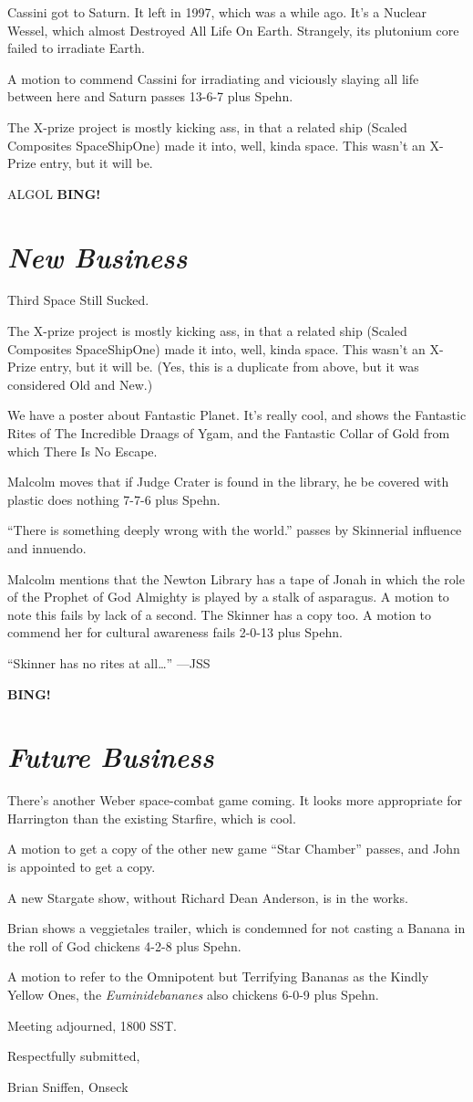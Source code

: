 \documentclass[10pt]{article}
\newcommand{\bing}{{\bf BING!} }
\newcommand{\goto}[1]{\bing \vskip 12pt \section*{{\em{#1}}}}
\newcommand{\ps}{ plus Spehn\xspace}
\begin{document}
Cassini got to Saturn.  It left in 1997, which was a while ago.  It's
a Nuclear Wessel, which almost Destroyed All Life On Earth.
Strangely, its plutonium core failed to irradiate Earth.  

A motion to commend Cassini for irradiating and viciously slaying all
life between here and Saturn passes 13-6-7\ps.

The X-prize project is mostly kicking ass, in that a related ship
(Scaled Composites SpaceShipOne) made it into, well, kinda space.
This wasn't an X-Prize entry, but it will be.

ALGOL
\goto{New Business}

Third Space Still Sucked.

The X-prize project is mostly kicking ass, in that a related ship
(Scaled Composites SpaceShipOne) made it into, well, kinda space.
This wasn't an X-Prize entry, but it will be.  (Yes, this is a
duplicate from above, but it was considered Old and New.)

We have a poster about Fantastic Planet.  It's really cool, and shows
the Fantastic Rites of The Incredible Draags of Ygam, and the
Fantastic Collar of Gold from which There Is No Escape.

Malcolm moves that if Judge Crater is found in the library, he be
covered with plastic does nothing 7-7-6\ps.

``There is something deeply wrong with the world.'' passes by
Skinnerial influence and innuendo.

Malcolm mentions that the Newton Library has a tape of Jonah in which
the role of the Prophet of God Almighty is played by a stalk of
asparagus.  A motion to note this fails by lack of a second.  The
Skinner has a copy too.  A motion to commend her for cultural
awareness fails 2-0-13\ps.

``Skinner has no rites at all\dots'' ---JSS

\goto{Future Business}

There's another Weber space-combat game coming.  It looks more
appropriate for Harrington than the existing Starfire, which is cool.

A motion to get a copy of the other new game ``Star Chamber'' passes,
and John is appointed to get a copy.

A new Stargate show, without Richard Dean Anderson, is in the works.

Brian shows a veggietales trailer, which is condemned for not casting
a Banana in the roll of God chickens 4-2-8\ps.

A motion to refer to the Omnipotent but Terrifying Bananas as the
Kindly Yellow Ones, the \emph{Euminidebananes} also chickens 6-0-9\ps.

\vspace{12pt}

\noindent
Meeting adjourned, 1800 SST.

\vspace{18pt}

\centerline{Respectfully submitted,}
\centerline{Brian Sniffen, Onseck}
\end{document}
